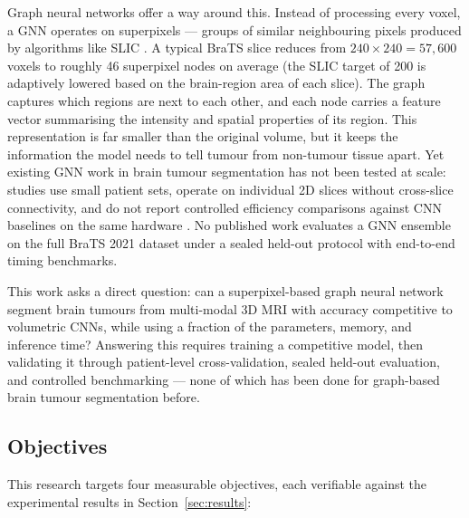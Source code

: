 \documentclass{article}
\begin{document}
Graph neural networks offer a way around this. Instead of processing every voxel,
a GNN operates on superpixels --- groups of similar neighbouring pixels produced
by algorithms like SLIC \cite{achanta2012slic}. A typical BraTS slice reduces
from $240 \times 240 = 57{,}600$ voxels to roughly 46 superpixel nodes on average
(the SLIC target of 200 is adaptively lowered based on the brain-region area of each
slice). The graph
captures which regions are next to each other, and each node carries a feature
vector summarising the intensity and spatial properties of its region. This
representation is far smaller than the original volume, but it keeps the
information the model needs to tell tumour from non-tumour tissue apart. Yet
existing GNN work in brain tumour segmentation has not been tested at scale:
studies use small patient sets, operate on individual 2D slices without
cross-slice connectivity, and do not report controlled efficiency comparisons
against CNN baselines on the same hardware \cite{kipf2017gcn, hamilton2017graphsage}.
No published work evaluates a GNN ensemble on the full BraTS 2021 dataset under a
sealed held-out protocol with end-to-end timing benchmarks.

This work asks a direct question: can a superpixel-based graph neural network
segment brain tumours from multi-modal 3D MRI with accuracy competitive to
volumetric CNNs, while using a fraction of the parameters, memory, and inference
time? Answering this requires training a competitive model, then validating it
through patient-level cross-validation, sealed held-out evaluation, and controlled
benchmarking --- none of which has been done for graph-based brain tumour
segmentation before.

\subsection{Objectives}
\label{sec:objectives}

This research targets four measurable objectives, each verifiable against
the experimental results in Section~\ref{sec:results}:
\end{document}
